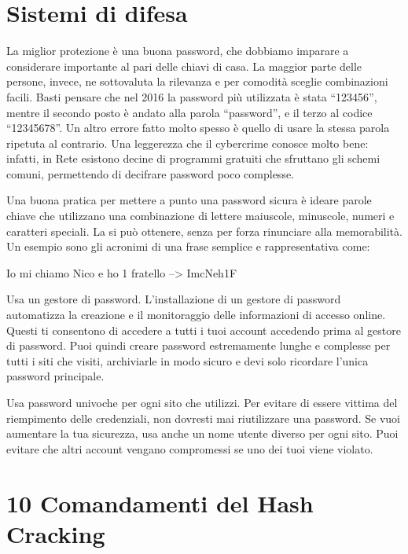 \section{Sistemi di difesa}

La miglior protezione è una buona password, che dobbiamo imparare a considerare importante al pari delle chiavi di casa. La maggior parte delle persone, invece, ne sottovaluta la rilevanza e per comodità sceglie combinazioni facili. Basti pensare che nel 2016 la password più utilizzata è stata “123456”, mentre il secondo posto è andato alla parola “password”, e il terzo al codice “12345678”. Un altro errore fatto molto spesso è quello di usare la stessa parola ripetuta al contrario. Una leggerezza che il cybercrime conosce molto bene: infatti, in Rete esistono decine di programmi gratuiti che sfruttano gli schemi comuni, permettendo di decifrare password poco complesse.

Una buona pratica per mettere a punto una password sicura è ideare parole chiave che utilizzano una combinazione di lettere maiuscole, minuscole, numeri e caratteri speciali. La si può ottenere, senza per forza rinunciare alla memorabilità. Un esempio sono gli acronimi di una frase semplice e rappresentativa come:

\medskip

Io mi chiamo Nico e ho 1 fratello  -->  ImcNeh1F

\medskip

Usa un gestore di password. L'installazione di un gestore di password automatizza la creazione e il monitoraggio delle informazioni di accesso online. Questi ti consentono di accedere a tutti i tuoi account accedendo prima al gestore di password. Puoi quindi creare password estremamente lunghe e complesse per tutti i siti che visiti, archiviarle in modo sicuro e devi solo ricordare l'unica password principale.

Usa password univoche per ogni sito che utilizzi. Per evitare di essere vittima del riempimento delle credenziali, non dovresti mai riutilizzare una password. Se vuoi aumentare la tua sicurezza, usa anche un nome utente diverso per ogni sito. Puoi evitare che altri account vengano compromessi se uno dei tuoi viene violato.

\section{10 Comandamenti del Hash Cracking}

